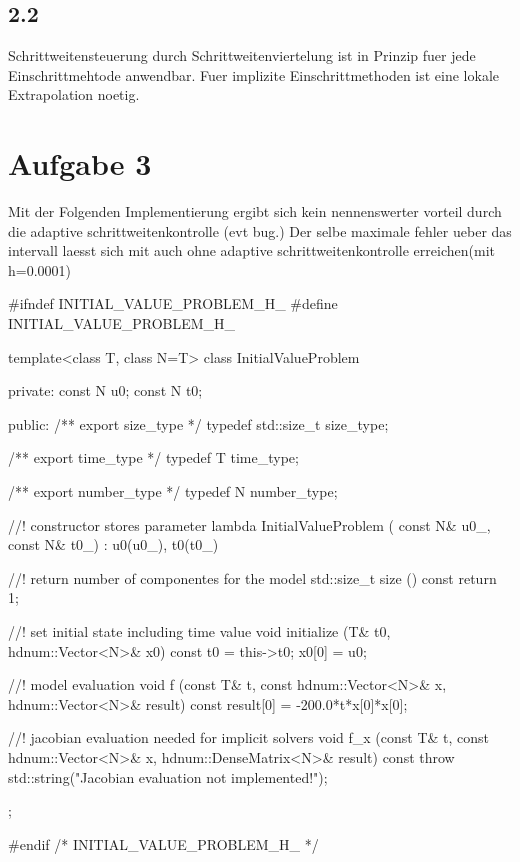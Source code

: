 \documentclass[10pt,oneside,a4paper]{scrartcl}
\begin{document}
\subsection*{2.2}
Schrittweitensteuerung durch Schrittweitenviertelung ist in Prinzip fuer jede Einschrittmehtode anwendbar. Fuer implizite Einschrittmethoden ist eine lokale Extrapolation noetig.


\section*{Aufgabe 3}
Mit der Folgenden Implementierung ergibt sich kein nennenswerter vorteil durch die adaptive schrittweitenkontrolle (evt bug.)
Der selbe maximale fehler ueber das intervall laesst sich mit auch ohne
 adaptive schrittweitenkontrolle erreichen(mit h=0.0001)

\begin{cppcode}
#ifndef INITIAL_VALUE_PROBLEM_H_
#define INITIAL_VALUE_PROBLEM_H_

template<class T, class N=T>
class InitialValueProblem {
private:
  const N u0;
  const N t0;

public:
  /** \brief export size_type */
  typedef std::size_t size_type;

  /** \brief export time_type */
  typedef T time_type;

  /** \brief export number_type */
  typedef N number_type;

  //! constructor stores parameter lambda
  InitialValueProblem ( const N& u0_, const N& t0_)
    :  u0(u0_), t0(t0_)
  {}

  //! return number of componentes for the model
  std::size_t size () const
  {
    return 1;
  }

  //! set initial state including time value
  void initialize (T& t0, hdnum::Vector<N>& x0) const
  {
    t0 = this->t0;
    x0[0] = u0;
  }

  //! model evaluation
  void f (const T& t, const hdnum::Vector<N>& x, hdnum::Vector<N>& result) const
  {
    result[0] = -200.0*t*x[0]*x[0];
  }

  //! jacobian evaluation needed for implicit solvers
  void f_x (const T& t, const hdnum::Vector<N>& x, hdnum::DenseMatrix<N>& result) const
  {
    throw std::string("Jacobian evaluation not implemented!");
  }
};

#endif /* INITIAL_VALUE_PROBLEM_H_ */

\end{cppcode}
\end{document}
